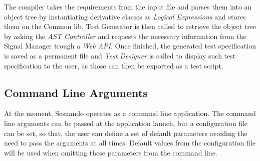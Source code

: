 The compiler takes the requirements from the input file and parses them into an object tree by instantiating derivative classes as \textit{Logical Expressions} and stores them on the Common lib. Test Generator is then called to retrieve the object tree by asking the \textit{AST Controller} and requests the necessary information from the Signal Manager trough a \textit{Web API}. Once finished, the generated test specification is saved as a permanent file and \textit{Test Designer} is called to display such test specification to the user, as those can then be exported as a test script.


\subsection{Command Line Arguments}
\label{subsec:command_line_arguments}

At the moment, Sesnando operates as a command line application. The command line arguments can be passed at the application launch, but a configuration file can be set, so that, the user can define a set of default parameters avoiding the need to pass the arguments at all times. Default values from the configuration file will be used when omitting these parameters from the command line.

